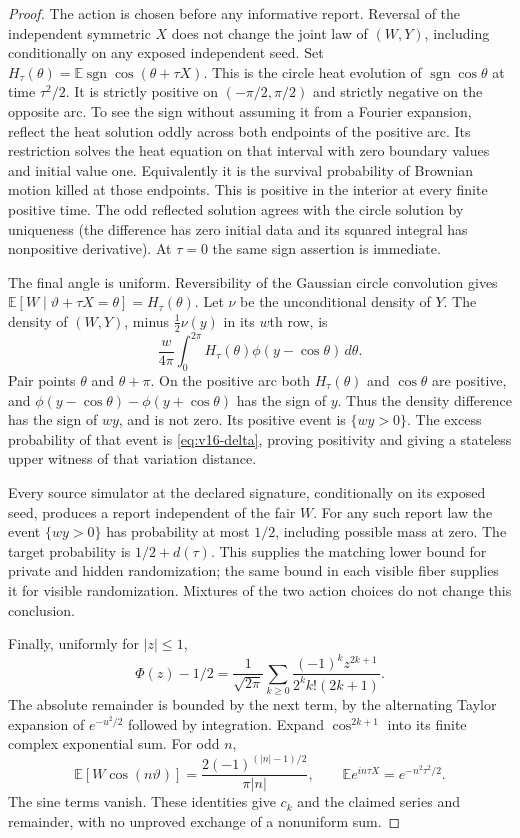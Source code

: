 \begin{proof}
The action is chosen before any informative report. Reversal of the
independent symmetric $X$ does not change the joint law of $(W,Y)$,
including conditionally on any exposed independent seed. Set
$H_\tau(\theta)=\mathbb E\operatorname{sgn}\cos(\theta+\tau X)$.
This is the circle heat evolution of $\operatorname{sgn}\cos\theta$
at time $\tau^2/2$. It is strictly positive on $(-\pi/2,\pi/2)$ and
strictly negative on the opposite arc. To see the sign without assuming
it from a Fourier expansion, reflect the heat solution oddly across
both endpoints of the positive arc. Its restriction solves the heat
equation on that interval with zero boundary values and initial value
one. Equivalently it is the survival probability of Brownian motion
killed at those endpoints. This is positive in the interior at every
finite positive time. The odd reflected solution agrees with the
circle solution by uniqueness (the difference has zero initial data
and its squared integral has nonpositive derivative). At $\tau=0$
the same sign assertion is immediate.

The final angle is uniform. Reversibility of the Gaussian circle
convolution gives $\mathbb E[W\mid\vartheta+\tau X=\theta]
=H_\tau(\theta)$. Let $\nu$ be the unconditional density of $Y$.
The density of $(W,Y)$, minus $\tfrac12\nu(y)$ in its $w$th row, is
\[
 \frac{w}{4\pi}\int_0^{2\pi}H_\tau(\theta)
                                      \phi(y-\cos\theta)\,d\theta.
\]
Pair points $\theta$ and $\theta+\pi$. On the positive arc both
$H_\tau(\theta)$ and $\cos\theta$ are positive, and
$\phi(y-\cos\theta)-\phi(y+\cos\theta)$ has the sign of $y$.
Thus the density difference has the sign of $wy$, and is not zero.
Its positive event is $\{wy>0\}$. The excess probability of that event
is \eqref{eq:v16-delta}, proving positivity and giving a stateless upper
witness of that variation distance.

Every source simulator at the declared signature, conditionally on
its exposed seed, produces a report independent of the fair $W$.
For any such report law the event $\{wy>0\}$ has probability at most
$1/2$, including possible mass at zero. The target probability is
$1/2+d(\tau)$. This supplies the matching lower bound for private and
hidden randomization; the same bound in each visible fiber supplies
it for visible randomization. Mixtures of the two action choices do
not change this conclusion.

Finally, uniformly for $|z|\le1$,
\[
 \Phi(z)-1/2=\frac1{\sqrt{2\pi}}
       \sum_{k\ge0}\frac{(-1)^kz^{2k+1}}{2^kk!(2k+1)}.
\]
The absolute remainder is bounded by the next term, by the alternating
Taylor expansion of $e^{-u^2/2}$ followed by integration. Expand
$\cos^{2k+1}$ into its finite complex exponential sum. For odd $n$,
\[
 \mathbb E[W\cos(n\vartheta)]
       =\frac{2(-1)^{(|n|-1)/2}}{\pi|n|},\qquad
 \mathbb E e^{in\tau X}=e^{-n^2\tau^2/2}.
\]
The sine terms vanish. These identities give $c_k$ and the claimed
series and remainder, with no unproved exchange of a nonuniform sum.
\end{proof}

